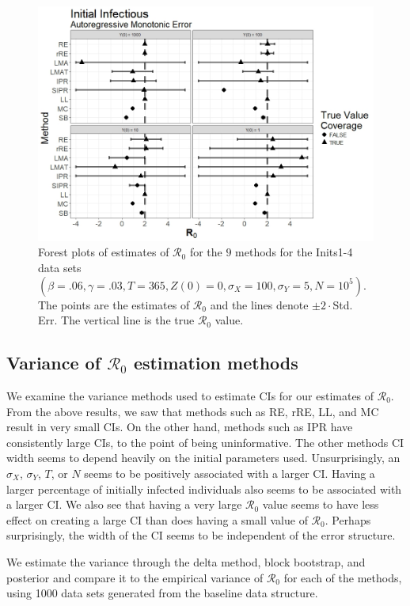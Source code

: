 \documentclass[12pt]{article}
\newcommand{\xxsir}{\ensuremath{9} } %
\newcommand{\rr}{\ensuremath{\mathcal{R}_0}}
\begin{document}
  
\begin{figure}[H]
	\centering
	\includegraphics[scale=0.5]{images/start_arm.jpeg}
	\caption{Forest plots of estimates of $\rr$ for the \xxsir methods for the Inits1-4 data sets $(\beta=.06, \gamma=.03, T=365,  Z(0)=0, \sigma_X=100, \sigma_Y=5, N=10^5)$.  The points are the estimates of $\rr$ and the lines denote $\pm 2\cdot $Std. Err.  The vertical line is the true $\rr$ value.}\label{fig:ar-small-I}
\end{figure}




\subsection{Variance of $\rr$ estimation methods}\label{sec:sim-var-res}
We examine the variance methods used to estimate CIs for our estimates of $\rr$.  From the above results, we saw that methods such as RE, rRE, LL, and MC result in very small CIs.  On the other hand, methods such as IPR have consistently large CIs, to the point of being uninformative.  The other methods CI width seems to depend heavily on the initial parameters used.  Unsurprisingly, an $\sigma_X$, $\sigma_Y$, $T$, or $N$ seems to be positively associated with a larger CI.  Having a larger percentage of initially infected individuals also seems to be associated with a larger CI.  We also see that having a very large $\rr$ value seems to have less effect on creating a large CI than does having a small value of $\rr$.  Perhaps surprisingly, the width of the CI seems to be independent of the error structure.

We estimate the variance through the delta method, block bootstrap, and posterior and compare it to the empirical variance of $\rr$ for each of the methods, using 1000 data sets generated from the baseline data structure.
\end{document}

